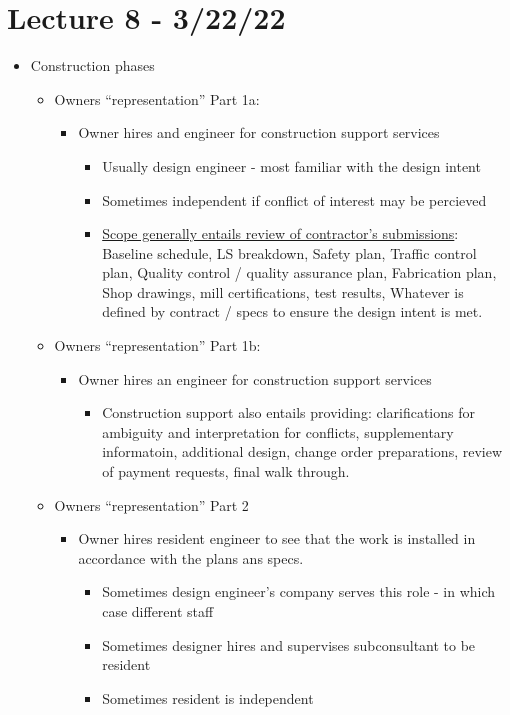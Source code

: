 \documentclass{article}
\begin{document}
\section*{Lecture 8 - 3/22/22}
\begin{itemize}
    \item Construction phases
    \begin{itemize}
        \item Owners ``representation'' Part 1a:
        \begin{itemize}
            \item Owner hires and engineer for construction support services
            \begin{itemize}
                \item Usually design engineer - most familiar with the design intent
                \item Sometimes independent if conflict of interest may be percieved
                \item \underline{Scope generally entails review of contractor's submissions}: Baseline schedule, LS breakdown, Safety plan, Traffic control plan, Quality control / quality assurance plan, Fabrication plan, Shop drawings, mill certifications, test results, Whatever is defined by contract / specs to ensure the design intent is met.
            \end{itemize}
        \end{itemize}
        \item Owners ``representation'' Part 1b:
        \begin{itemize}
            \item Owner hires an engineer for construction support services
            \begin{itemize}
                \item Construction support also entails providing: clarifications for ambiguity and interpretation for conflicts, supplementary informatoin, additional design, change order preparations, review of payment requests, final walk through.
            \end{itemize}
        \end{itemize}
        \item Owners ``representation'' Part 2
        \begin{itemize}
            \item Owner hires resident engineer to see that the work is installed in accordance with the plans ans specs.
            \begin{itemize}
                \item Sometimes design engineer's company serves this role - in which case different staff
                \item Sometimes designer hires and supervises subconsultant to be resident
                \item Sometimes resident is independent 
            \end{itemize}
        \end{itemize}
    \end{itemize}
\end{itemize}
\end{document}
